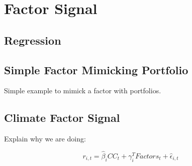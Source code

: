 \chapter{Factor Signal}

\section{Regression}

\section{Simple Factor Mimicking Portfolio}

Simple example to mimick a factor with portfolios.

\section{Climate Factor Signal}

Explain why we are doing:

\begin{equation}
    r_{i,t} = \hat{\beta}_i CC_t + \gamma_i^T Factors_t + \hat{\epsilon}_{i,t}
\end{equation}


